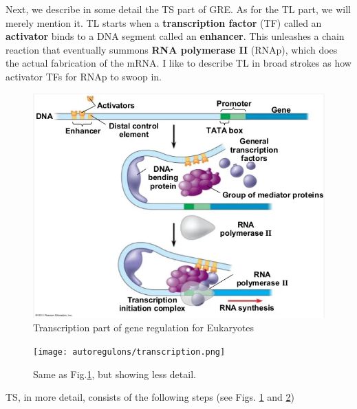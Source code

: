Next, we describe
in some detail the TS
part of GRE. As for the TL
part, we will merely mention it. TL starts
when a {\bf transcription factor} (TF) called an {\bf activator}
binds to a DNA segment called
an {\bf enhancer}. This unleashes
a chain reaction that eventually summons {\bf RNA polymerase II} (RNAp), which does the actual fabrication of the mRNA. I like to describe TL in broad strokes as how 
activator TFs   for RNAp to swoop in.

\begin{figure}[h!]
\centering
\includegraphics[width=5in]
{autoregulons/transcription-detailed}
\caption{Transcription part of gene regulation for Eukaryotes}
\label{fig-transcription-detailed}
\end{figure}

\begin{figure}[h!]
\centering
\texttt{[image: autoregulons/transcription.png]}
\caption{Same as Fig.\ref{fig-transcription-detailed},
but showing less detail.}
\label{fig-transcription}
\end{figure}

TS, in more detail, consists
of the following steps (see Figs.
\ref{fig-transcription-detailed}
and \ref{fig-transcription})


